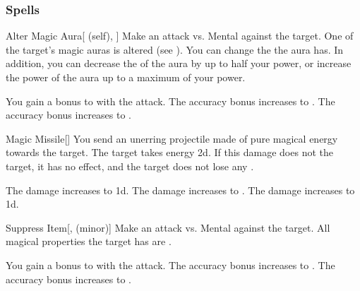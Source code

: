 \subsubsection{Spells}


\lowercase{\hypertarget{spell:Alter Magic Aura}{}}\label{spell:Alter Magic Aura}
\begin{attuneability}[Rank 1]{\hypertarget{spell:Alter Magic Aura}{Alter Magic Aura}}[ (self), ]
Make an attack vs. Mental against the target.
\hit One of the target's magic auras is altered (see ).
You can change the  the aura has.
In addition, you can decrease the  of the aura by up to half your power, or increase the power of the aura up to a maximum of your power.

\rankline
{} You gain a  bonus to  with the attack.
 The accuracy bonus increases to .
 The accuracy bonus increases to .

\end{attuneability}
\vspace{0.25em}



\lowercase{\hypertarget{spell:Magic Missile}{}}\label{spell:Magic Missile}
\begin{freeability}[Rank 1]{\hypertarget{spell:Magic Missile}{Magic Missile}}[]
You send an unerring projectile made of pure magical energy towards the target.
The target takes energy  \minus2d.
If this damage does not  the target, it has no effect, and the target does not lose any .

\rankline
{} The damage increases to  \minus1d.
 The damage increases to .
 The damage increases to  \plus1d.

\end{freeability}
\vspace{0.25em}



\lowercase{\hypertarget{spell:Suppress Item}{}}\label{spell:Suppress Item}
\begin{freeability}[Rank 1]{\hypertarget{spell:Suppress Item}{Suppress Item}}[,  (minor)]
Make an attack vs. Mental against the target.
\hit All magical properties the target has are .

\rankline
{} You gain a  bonus to  with the attack.
 The accuracy bonus increases to .
 The accuracy bonus increases to .

\end{freeability}
\vspace{0.25em}



